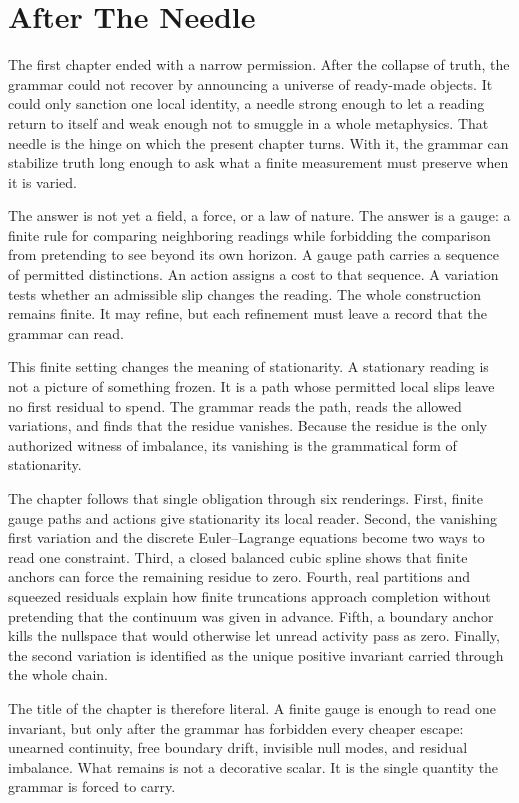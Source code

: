 \section{After The Needle}

The first chapter ended with a narrow permission. After the collapse of
truth, the grammar could not recover by announcing a universe of ready-made
objects. It could only sanction one local identity, a needle strong enough
to let a reading return to itself and weak enough not to smuggle in a whole
metaphysics. That needle is the hinge on which the present chapter turns.
With it, the grammar can stabilize truth long enough to ask what a finite
measurement must preserve when it is varied.

The answer is not yet a field, a force, or a law of nature. The answer is a
gauge: a finite rule for comparing neighboring readings while forbidding
the comparison from pretending to see beyond its own horizon. A gauge path
carries a sequence of permitted distinctions. An action assigns a cost to
that sequence. A variation tests whether an admissible slip changes the
reading. The whole construction remains finite. It may refine, but each
refinement must leave a record that the grammar can read.

This finite setting changes the meaning of stationarity. A stationary
reading is not a picture of something frozen. It is a path whose permitted
local slips leave no first residual to spend. The grammar reads the path,
reads the allowed variations, and finds that the residue vanishes. Because
the residue is the only authorized witness of imbalance, its vanishing is
the grammatical form of stationarity.

The chapter follows that single obligation through six renderings. First,
finite gauge paths and actions give stationarity its local reader. Second,
the vanishing first variation and the discrete Euler--Lagrange equations
become two ways to read one constraint. Third, a closed balanced cubic
spline shows that finite anchors can force the remaining residue to zero.
Fourth, real partitions and squeezed residuals explain how finite
truncations approach completion without pretending that the continuum was
given in advance. Fifth, a boundary anchor kills the nullspace that would
otherwise let unread activity pass as zero. Finally, the second variation is
identified as the unique positive invariant carried through the whole
chain.

The title of the chapter is therefore literal. A finite gauge is enough to
read one invariant, but only after the grammar has forbidden every cheaper
escape: unearned continuity, free boundary drift, invisible null modes, and
residual imbalance. What remains is not a decorative scalar. It is the
single quantity the grammar is forced to carry.
